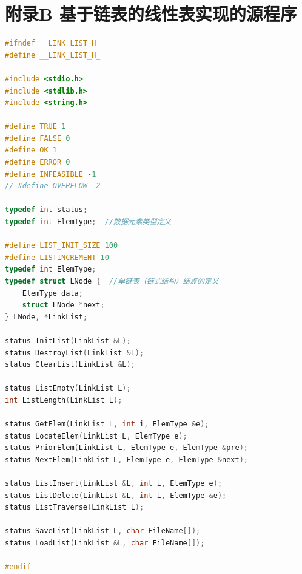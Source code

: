 \documentclass[supercite]{Experimental_Report}
\theoremstyle{definition}
\begin{document}
\section{附录B 基于链表的线性表实现的源程序}
\begin{lstlisting}[caption={$link\_list.h$}, language=C++, frame=single]
#ifndef __LINK_LIST_H_
#define __LINK_LIST_H_

#include <stdio.h>
#include <stdlib.h>
#include <string.h>

#define TRUE 1
#define FALSE 0
#define OK 1
#define ERROR 0
#define INFEASIBLE -1
// #define OVERFLOW -2

typedef int status;
typedef int ElemType;  //数据元素类型定义

#define LIST_INIT_SIZE 100
#define LISTINCREMENT 10
typedef int ElemType;
typedef struct LNode {  //单链表（链式结构）结点的定义
    ElemType data;
    struct LNode *next;
} LNode, *LinkList;

status InitList(LinkList &L);
status DestroyList(LinkList &L);
status ClearList(LinkList &L);

status ListEmpty(LinkList L);
int ListLength(LinkList L);

status GetElem(LinkList L, int i, ElemType &e);
status LocateElem(LinkList L, ElemType e);
status PriorElem(LinkList L, ElemType e, ElemType &pre);
status NextElem(LinkList L, ElemType e, ElemType &next);

status ListInsert(LinkList &L, int i, ElemType e);
status ListDelete(LinkList &L, int i, ElemType &e);
status ListTraverse(LinkList L);

status SaveList(LinkList L, char FileName[]);
status LoadList(LinkList &L, char FileName[]);

#endif
\end{lstlisting}
\end{document}
